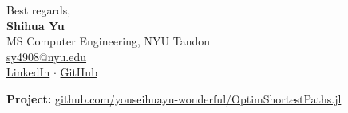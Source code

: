 \documentclass[12pt,letterpaper]{article}
\begin{document}
\vspace{1.2em}

Best regards,\\[0.3em]
\textbf{Shihua Yu}\\
MS Computer Engineering, NYU Tandon\\
\href{mailto:sy4908@nyu.edu}{sy4908@nyu.edu}\\
\href{https://www.linkedin.com/in/shihuayu}{LinkedIn} $\cdot$ \href{https://github.com/youseihuayu-wonderful}{GitHub}

\vspace{1em}

\noindent\textbf{Project:} \href{https://github.com/youseihuayu-wonderful/OptimShortestPaths.jl}{github.com/youseihuayu-wonderful/OptimShortestPaths.jl}
\end{document}
